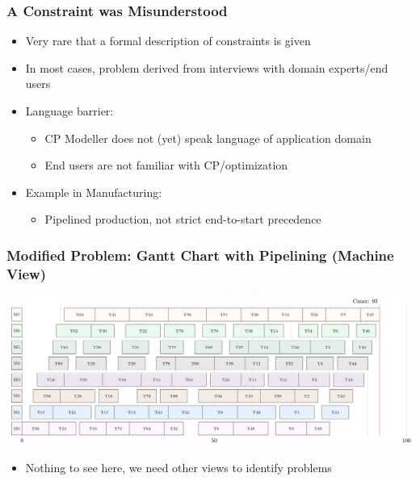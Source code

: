 \documentclass[dvipsnames,aspectratio=169]{beamer}
\begin{document}

\begin{frame}
  \frametitle{A Constraint was Misunderstood}
  \begin{itemize}
  \item Very rare that a formal description of constraints is given
  \item In most cases, problem derived from interviews with domain experts/end users
  \item Language barrier: 
  \begin{itemize}
      \item CP Modeller does not (yet) speak language of application domain
      \item End users are not familiar with CP/optimization
  \end{itemize}
  \item Example in Manufacturing:
  \begin{itemize}
  \item Pipelined production, not strict end-to-start precedence
  \end{itemize}
  \end{itemize}
\end{frame}

\begin{frame}
  \frametitle{Modified Problem: Gantt Chart with Pipelining (Machine View)}
  \includegraphics[width=14cm]{images/pipelinemachineview}
  \begin{itemize}
      \item Nothing to see here, we need other views to identify problems
  \end{itemize}
\end{frame}
\end{document}
